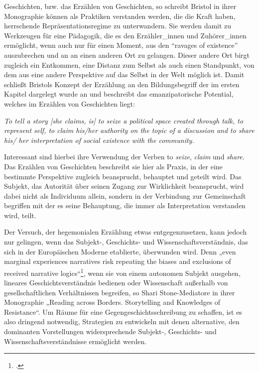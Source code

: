   Geschichten, bzw. das Erzählen von Geschichten, so schreibt Bristol in ihrer
  Monographie können als Praktiken verstanden werden, die die Kraft haben,
  herrschende Repräsentationsregime zu unterwandern. Sie werden damit zu
  Werkzeugen für eine Pädagogik, die es den Erzähler\_innen und Zuhörer\_innen
  ermöglicht, wenn auch nur für einen Moment, aus den “ravages of
  existence”\footnotemark {}
  auszubrechen und an an einen anderen Ort zu gelangen. Dieser andere Ort birgt
  zugleich ein Entkommen, eine Distanz zum Selbst  als auch einen Standpunkt,
  von dem aus eine andere Perspektive auf das Selbst in der Welt möglich ist.
  Damit schließt Bristols Konzept der Erzählung an den Bildungsbegriff der im
  ersten Kapitel dargelegt wurde an und beschreibt das emanzipatorische
  Potential, welches im Erzählen von Geschichten liegt:
  \begin{myenv}

\textit{\glqq To tell a story [she claims, is] to seize a political space
  created through talk, to represent self, to claim his/her authority on
  the topic of a discussion and to share his/ her interpretation of social
existence with the community.\grqq\footnotemark {}} 
\end{myenv}

Interessant sind hierbei ihre Verwendung der Verben to \textit{seize},
\textit{claim} und \textit{share}.
Das Erzählen von Geschichten beschreibt sie hier als Praxis, in der eine
bestimmte Perspektive zugleich beansprucht, behauptet und geteilt wird. Das
Subjekt, das Autorität über seinen Zugang zur Wirklichkeit beansprucht, wird
dabei nicht als Individuum allein, sondern in der Verbindung zur Gemeinschaft
begriffen mit der es seine Behauptung, die immer als Interpretation verstanden wird, teilt.

Der Versuch, der hegemonialen Erzählung etwas entgegenzusetzen, kann jedoch nur
gelingen, wenn das Subjekt-, Geschichts- und Wissenschaftsverständnis, das sich
in der Europäischen Moderne etablierte, überwunden wird. Denn „even marginal
experiences narratives risk repeating the biases and exclusions of received
narrative logics“\footnotemark \footcitetext[S. 142]{sstone}, wenn sie von einem autonomen Subjekt ausgehen, lineares
Geschichtsverständnis bedienen oder Wissenschaft außerhalb von
gesellschaftlichen Verhältnissen begreifen, so Shari Stone-Mediatore in ihrer
Monographie „Reading across Borders. Storytelling and Knowledges of
Resistance“\footnotemark {}. Um Räume für eine Gegengeschichtsschreibung zu schaffen, ist es
also dringend notwendig, Strategien zu entwickeln mit denen alternative, den
dominanten Vorstellungen widersprechende Subjekt-, Geschichts- und
Wissenschaftsverständnisse ermöglicht werden.

